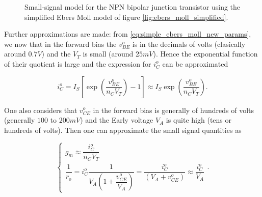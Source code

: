 \begin{figure}[h]
\centering
	\caption{Small-signal model for the NPN bipolar junction transistor using the simplified Ebers Moll model of figure \ref{fig:ebers_moll_simplified}.}
	\label{fig:ebers_moll_small_signal}
\end{figure} %

	Further approximations are made: from \eqref{eq:simple_ebers_moll_new_params}, we now that in the forward bias the $v_{BE}^o$ is in the decimals of volts (clasically around $0.7V$) and the $V_T$ is small (around $25mV$). Hence the exponential function of their quotient is large and the expression for $i_C^o$ can be approximated

\begin{equation} i_C^o = I_{S}\left[\exp\left(\dfrac{v_{BE}^o}{n_CV_T}\right) - 1\right] \approx I_{S}\exp\left(\dfrac{v_{BE}^o}{n_CV_T}\right) .\end{equation}

	One also considers that $v_{CE}^o$ in the forward bias is generally of hundreds of volts (generally $100$ to $200mV$) and the Early voltage $V_A$ is quite high (tens or hundreds of volts). Then one can approximate the small signal quantities as

\begin{equation}
	\left\{\begin{array}{l}
		g_m \approx  \dfrac{i_C^o}{n_CV_T} \\[5mm]
		\dfrac{1}{r_o} =  i_C^o \dfrac{1}{V_A\left(1 + \dfrac{v_{CE}^o}{V_A}\right)} = \dfrac{i_C^o}{\left(V_A + v_{CE}^o\right)} \approx \dfrac{i_C^o}{V_A}
	\end{array}\right. .
\end{equation}

